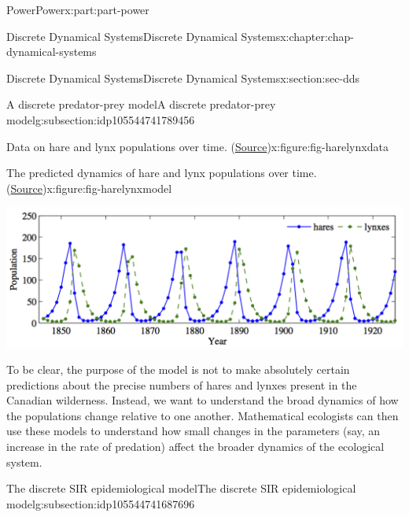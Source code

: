 \documentclass[oneside,10pt,]{book}
\numberwithin{equation}{section}
\begin{document}
\begin{partptx}{Power}{}{Power}{}{}{x:part:part-power}
\begin{chapterptx}{Discrete Dynamical Systems}{}{Discrete Dynamical Systems}{}{}{x:chapter:chap-dynamical-systems}
\begin{sectionptx}{Discrete Dynamical Systems}{}{Discrete Dynamical Systems}{}{}{x:section:sec-dds}
\begin{subsectionptx}{A discrete predator-prey model}{}{A discrete predator-prey model}{}{}{g:subsection:idp105544741789456}
\begin{figureptx}{Data on hare and lynx populations over time. (\href{https://www.cds.caltech.edu/\~murray/amwiki/index.php/Predator_prey}{Source}\protect\footnotemark{})}{x:figure:fig-harelynxdata}{}
\tcblower
\end{figureptx}%
%
\begin{figureptx}{The predicted dynamics of hare and lynx populations over time. (\href{https://www.cds.caltech.edu/\~murray/amwiki/index.php/Predator_prey}{Source}\protect\footnotemark{})}{x:figure:fig-harelynxmodel}{}%
\begin{image}{0.25}{0.5}{0.25}%
\includegraphics[width=\linewidth]{./images/Predprey-discrete.png}
\end{image}%
\tcblower
\end{figureptx}%
%
To be clear, the purpose of the model is not to make absolutely certain predictions about the precise numbers of hares and lynxes present in the Canadian wilderness. Instead, we want to understand the broad dynamics of how the populations change relative to one another. Mathematical ecologists can then use these models to understand how small changes in the parameters (say, an increase in the rate of predation) affect the broader dynamics of the ecological system.%
\end{subsectionptx}
%
%
\typeout{************************************************}
\typeout{************************************************}
%
\begin{subsectionptx}{The discrete SIR epidemiological model}{}{The discrete SIR epidemiological model}{}{}{g:subsection:idp105544741687696}

\end{subsectionptx}
\end{sectionptx}
\end{chapterptx}
\end{partptx}
\end{document}
